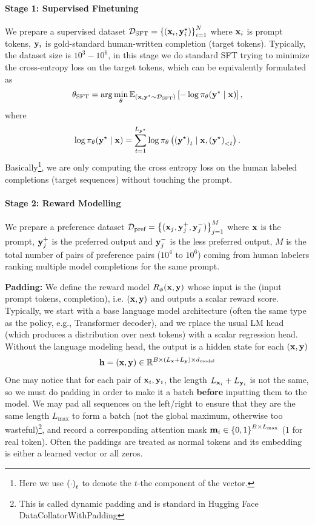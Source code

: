 \documentclass[11pt]{article}  %
\begin{document}
\paragraph{Stage 1: Supervised Finetuning} We prepare a supervised dataset $\mathcal{D}_{\text{SFT}} = \left\{ (\mathbf{x}_i, \mathbf{y}_i^\star) \right\}_{i=1}^N$ where $\mathbf{x}_i$ is prompt tokens, $\mathbf{y}_i$ is gold-standard human-written completion (target tokens). 
Typically, the dataset size is $10^3 - 10^6$, in this stage we do standard SFT trying to minimize the cross-entropy loss on the target tokens, which can be equivalently formulated as 
\begin{align*}
  \theta_{\text{SFT}} = \arg\min_{\theta} \mathbb{E}_{(\mathbf{x}, \mathbf{y}^\star \sim \mathcal{D}_{\text{SFT}})}\left[- \log \pi_{\theta}(\mathbf{y}^\star \mid \mathbf{x})\right],
\end{align*}
where 
\begin{align*}
  \log \pi_{\theta}(\mathbf{y}^\star \mid \mathbf{x}) = \sum_{t=1}^{L_{\mathbf{y}^\star}}\log \pi_{\theta}\left( \left( \mathbf{y}^\star \right)_t \mid \mathbf{x},  \left( \mathbf{y}^\star \right)_{<t} \right).
\end{align*}
Basically\footnote{Here we use $\left( \cdot \right)_t$ to denote the $t$-the component of the vector.}, we are only computing the cross entropy loss on the human labeled completions (target sequences) without touching the prompt.


\paragraph{Stage 2: Reward Modelling} We prepare a preference dataset $\mathcal{D}_{\text{pref}} = \left\{ (\mathbf{x}_j, \mathbf{y}_j^+, \mathbf{y}_j^-) \right\}_{j=1}^M$ where $\mathbf{x}$ is the prompt, $\mathbf{y}_j^+$ is the preferred output and $\mathbf{y}_j^-$ is the less preferred output, $M$ is the total number of pairs of preference pairs ($10^4$ to $10^6$) coming from human labelers ranking multiple model completions for the same prompt.


\textbf{Padding:} We define the reward model $R_{\phi}(\mathbf{x}, \mathbf{y})$ whose input is the (input prompt tokens, completion), i.e. $(\mathbf{x}, \mathbf{y})$ and outputs a scalar reward score.
Typically, we start with a base language model architecture (often the same type as the policy, e.g., Transformer decoder), and we rplace the usual LM head (which produces a distribution over next tokens) with a scalar regression head. 
Without the language modeling head, the output is a hidden state for each $(\mathbf{x}, \mathbf{y})$
\begin{align*}
  \mathbf{h} = \left( \mathbf{x}, \mathbf{y} \right) \in \mathbb{R}^{B \times (L_{\mathbf{x}} + L_{\mathbf{y}}) \times d_{\text{model}}}
\end{align*}
One may notice that for each pair of $\mathbf{x}_i, \mathbf{y}_i$, the length $L_{\mathbf{x}_i} + L_{\mathbf{y}_i}$ is not the same, so we must do padding in order to make it a batch \textbf{before} inputting them to the model.
We may pad all sequences on the left/right to ensure that they are the same length $L_{\max}$ to form a batch (not the global maximum, otherwise too wasteful)\footnote{This is called dynamic padding and is standard in Hugging Face DataCollatorWithPadding}, and record a corresponding attention mask $\mathbf{m}_i \in \left\{ 0, 1 \right\}^{B \times L_{\max}}$ ($1$ for real token).
Often the paddings are treated as normal tokens and its embedding is either a learned vector or all zeros. 
\end{document}
